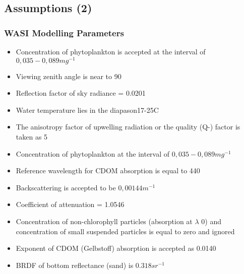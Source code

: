 \documentclass[pdflatex,compress,9pt,
	xcolor={dvipsnames,dvipsnames,svgnames,x11names,table},
	hyperref={colorlinks = true,breaklinks = true, urlcolor = NavyBlue, breaklinks = true}]{beamer}
\begin{document}
\subsection{Assumptions (2)}
\begin{frame}\frametitle{WASI Modelling Parameters}
\begin{itemize}
	\item Concentration of phytoplankton is accepted at the interval of $0,035-0,089mg^{-1}$
	\item Viewing zenith angle is near to 90\degree
	\item Reflection factor of sky radiance = 0.0201
	\item Water temperature lies in the diapason17-25\degree C
	\item The anisotropy factor of upwelling radiation or the quality (Q-) factor is taken as 5
	\item Concentration of phytoplankton at the interval of $0,035-0,089 mg^{-1}$
	\item Reference wavelength for \ac{CDOM} absorption is equal to 440
	\item Backscattering is accepted to be $0,00144m^{-1}$
	\item Coefficient of attenuation = 1.0546
	\item Concentration of non-chlorophyll particles (absorption at $\lambda$ 0) and concentration of small suspended particles is equal to zero and ignored
	\item Exponent of \ac{CDOM} (Gelbstoff) absorption is accepted as 0.0140
	\item \ac{BRDF} of bottom reflectance (sand) is $0.318 sr^{-1}$
\end{itemize}
\end{frame}
\end{document}
